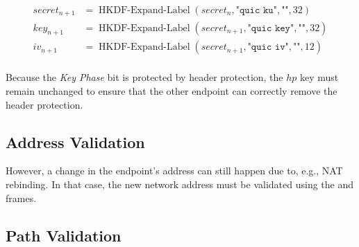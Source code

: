 \begin{equation*}
  \begin{split}
  secret_{n+1} & = \operatorname{HKDF-Expand-Label}(secret_{n}, \texttt{"quic ku"}, \texttt{""}, 32) \\
  key_{n+1} & = \operatorname{HKDF-Expand-Label}(secret_{n+1}, \texttt{"quic key"}, \texttt{""}, 32) \\
  iv_{n+1}  & = \operatorname{HKDF-Expand-Label}(secret_{n+1}, \texttt{"quic iv"}, \texttt{""}, 12)  \\
  \end{split}
\end{equation*}

Because the \textit{Key Phase} bit is protected by header protection, the $hp$ key must remain
unchanged to ensure that the other endpoint can correctly remove the header protection.

\subsection{Address Validation}\label{sec:02-address-validation}


However, a change in the endpoint's address can still happen due to, e.g., NAT rebinding. In that case, the new network address must be validated using the \PATHCHALLENGE{} and \PATHRESPONSE{} frames.

\subsection{Path Validation}\label{sec:02-path-validation}
